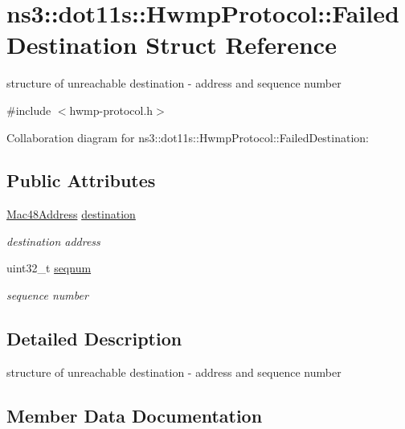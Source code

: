 \hypertarget{structns3_1_1dot11s_1_1HwmpProtocol_1_1FailedDestination}{}\section{ns3\+:\+:dot11s\+:\+:Hwmp\+Protocol\+:\+:Failed\+Destination Struct Reference}
\label{structns3_1_1dot11s_1_1HwmpProtocol_1_1FailedDestination}


structure of unreachable destination -\/ address and sequence number  




{\ttfamily \#include $<$hwmp-\/protocol.\+h$>$}



Collaboration diagram for ns3\+:\+:dot11s\+:\+:Hwmp\+Protocol\+:\+:Failed\+Destination\+:
\subsection*{Public Attributes}
\begin{DoxyCompactItemize}
\item 
\hyperlink{classns3_1_1Mac48Address}{Mac48\+Address} \hyperlink{structns3_1_1dot11s_1_1HwmpProtocol_1_1FailedDestination_a066b5f8457c2cac97e71978481a7fb35}{destination}
\begin{DoxyCompactList}\small\item\em destination address \end{DoxyCompactList}\item 
uint32\+\_\+t \hyperlink{structns3_1_1dot11s_1_1HwmpProtocol_1_1FailedDestination_adb7f9239135dd0d74cc71ac34fc13311}{seqnum}
\begin{DoxyCompactList}\small\item\em sequence number \end{DoxyCompactList}\end{DoxyCompactItemize}


\subsection{Detailed Description}
structure of unreachable destination -\/ address and sequence number 

\subsection{Member Data Documentation}
